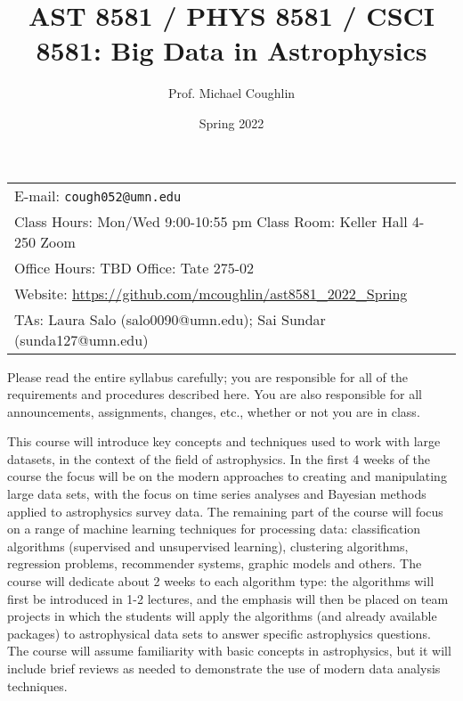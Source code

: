 \documentclass[12pt]{article}
\title{AST 8581 / PHYS 8581 / CSCI 8581: Big Data in Astrophysics}
\author{Prof. Michael Coughlin}
\date{Spring 2022}
\newcommand{\blankline}{\quad\pagebreak[2]}
\begin{document}
\maketitle

\blankline



\begin{tabular*}{.90\textwidth}{lr}  %


E-mail: \texttt{cough052@umn.edu} & \\ 
 Class Hours: Mon/Wed 9:00-10:55 pm \hspace{2em} Class Room: Keller Hall 4-250 Zoom \\
 Office Hours: TBD \hspace{2em} Office: Tate 275-02 \\
 Website: \url{https://github.com/mcoughlin/ast8581_2022_Spring} \\
 TAs: Laura Salo (salo0090@umn.edu); Sai Sundar (sunda127@umn.edu) 
\end{tabular*}

\vspace{5 mm}

\setlength{\parindent}{2em}
\setlength{\parskip}{0.6em}
\renewcommand{\baselinestretch}{1.2}


Please read the entire syllabus carefully; you are responsible for all of the requirements and procedures described here. You are also responsible for all announcements, assignments, changes, etc., whether or not you are in class. 

This course will introduce key concepts and techniques used to work with large datasets, in the
context of the field of astrophysics. In the first 4 weeks of the course the focus will be on the modern approaches to creating and manipulating large data sets, with the focus on time series analyses and Bayesian methods applied to astrophysics survey data. The remaining part of the course will focus on a range of machine learning techniques for processing data: classification algorithms (supervised and unsupervised learning), clustering algorithms, regression problems, recommender systems, graphic models and others. The course will dedicate about 2 weeks to each algorithm type: the algorithms will first be introduced in 1-2 lectures, and the emphasis will then be placed on team projects in which the students will apply the algorithms (and already available packages) to astrophysical data sets to answer specific astrophysics questions. The course will assume familiarity with basic concepts in astrophysics, but it will include brief reviews as needed to demonstrate the use of modern data analysis techniques.
\end{document}
